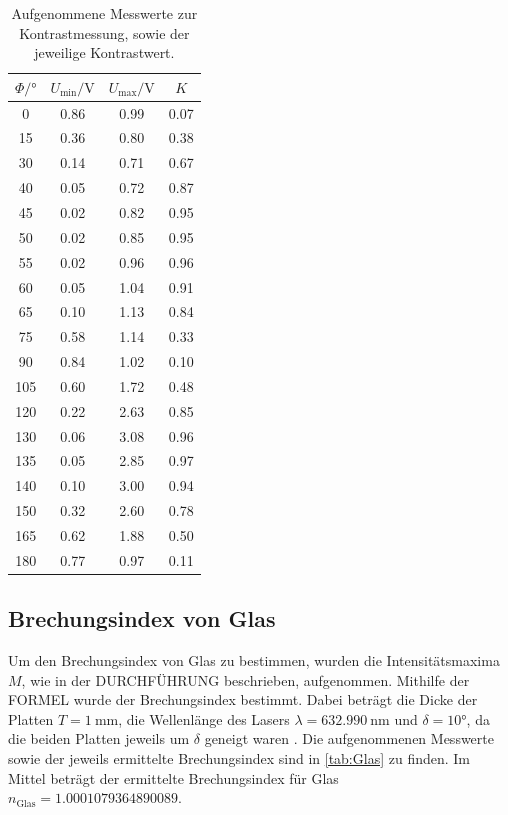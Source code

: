 \begin{table}
  \centering
  \caption{Aufgenommene Messwerte zur Kontrastmessung, sowie der jeweilige Kontrastwert.}
  \label{tab:Kontrast}
  \begin{tabular}{c c c c}
    \toprule
    $\Phi / ° $ & $U_{\text{min}} / \si{\volt}$ & $U_{\text{max}} / \si{\volt}$ & $K$ \\
    \midrule
    0     &  0.86  &  0.99  & 0.07  \\
    15    &  0.36  &  0.80  & 0.38  \\
    30    &  0.14  &  0.71  & 0.67  \\
    40    &  0.05  &  0.72  & 0.87  \\
    45    &  0.02  &  0.82  & 0.95  \\
    50    &  0.02  &  0.85  & 0.95  \\
    55    &  0.02  &  0.96  & 0.96  \\
    60    &  0.05  &  1.04  & 0.91  \\
    65    &  0.10  &  1.13  & 0.84  \\
    75    &  0.58  &  1.14  & 0.33  \\
    90    &  0.84  &  1.02  & 0.10  \\
    105   &  0.60  &  1.72  & 0.48  \\
    120   &  0.22  &  2.63  & 0.85  \\
    130   &  0.06  &  3.08  & 0.96  \\
    135   &  0.05  &  2.85  & 0.97  \\
    140   &  0.10  &  3.00  & 0.94  \\
    150   &  0.32  &  2.60  & 0.78  \\
    165   &  0.62  &  1.88  & 0.50  \\
    180   &  0.77  &  0.97  & 0.11  \\
    \bottomrule
  \end{tabular}
\end{table}

\subsection{Brechungsindex von Glas}
\label{subsec:n_Glas}
Um den Brechungsindex von Glas zu bestimmen, wurden die Intensitätsmaxima $M$, wie in der DURCHFÜHRUNG beschrieben, aufgenommen.
Mithilfe der FORMEL wurde der Brechungsindex bestimmt.
Dabei beträgt die Dicke der Platten $T = \SI{1}{\milli\metre}$, die Wellenlänge des Lasers $\lambda = \SI{632.990}{\nano\metre}$ und $\delta = 10°$, da die beiden Platten jeweils um $\delta$ geneigt waren \cite{anleitung}.
Die aufgenommenen Messwerte sowie der jeweils ermittelte Brechungsindex sind in \ref{tab:Glas} zu finden.
Im Mittel beträgt der ermittelte Brechungsindex für Glas $n_\text{Glas} = 1.0001079364890089$.


